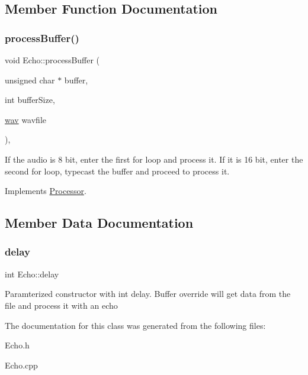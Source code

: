 \subsection{Member Function Documentation}
\mbox{\label{classEcho_af63c5069f6263bfb0a9f2b3ed0cef2f6}} 
\subsubsection{\texorpdfstring{process\+Buffer()}{processBuffer()}}
{\footnotesize\ttfamily void Echo\+::process\+Buffer (\begin{DoxyParamCaption}\item[{unsigned char $\ast$}]{buffer,  }\item[{int}]{buffer\+Size,  }\item[{\hyperlink{classwav}{wav}}]{wavfile }\end{DoxyParamCaption})\hspace{0.3cm}{\ttfamily [override]}, {\ttfamily [virtual]}}

If the audio is 8 bit, enter the first for loop and process it. If it is 16 bit, enter the second for loop, typecast the buffer and proceed to process it. 

Implements \hyperlink{classProcessor_ad81c2b75979636bcee7f5182cdb79a86}{Processor}.



\subsection{Member Data Documentation}
\mbox{\label{classEcho_abf5c35aa942bfae1832de23bb261e444}} 
\subsubsection{\texorpdfstring{delay}{delay}}
{\footnotesize\ttfamily int Echo\+::delay}

Paramterized constructor with int delay. Buffer override will get data from the file and process it with an echo 

The documentation for this class was generated from the following files\+:\begin{DoxyCompactItemize}
\item 
Echo.\+h\item 
Echo.\+cpp\end{DoxyCompactItemize}

